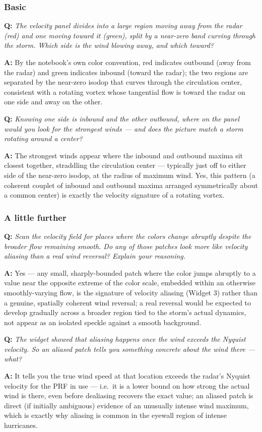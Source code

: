 \documentclass[11pt]{article}
\newenvironment{qa}[1]{\par\noindent\textbf{\color{qgray}Q: }\emph{#1}\par\noindent\textbf{A: }}{\par\vspace{6pt}}
\newcommand{\tier}[1]{\subsubsection*{#1}}
\begin{document}
\tier{Basic}
\begin{qa}{The velocity panel divides into a large region moving away from the radar (red) and one moving toward it (green), split by a near-zero band curving through the storm. Which side is the wind blowing away, and which toward?}
By the notebook's own color convention, red indicates outbound (away from the radar) and green indicates inbound (toward the radar); the two regions are separated by the near-zero isodop that curves through the circulation center, consistent with a rotating vortex whose tangential flow is toward the radar on one side and away on the other.
\end{qa}
\begin{qa}{Knowing one side is inbound and the other outbound, where on the panel would you look for the strongest winds --- and does the picture match a storm rotating around a center?}
The strongest winds appear where the inbound and outbound maxima sit closest together, straddling the circulation center --- typically just off to either side of the near-zero isodop, at the radius of maximum wind. Yes, this pattern (a coherent couplet of inbound and outbound maxima arranged symmetrically about a common center) is exactly the velocity signature of a rotating vortex.
\end{qa}

\tier{A little further}
\begin{qa}{Scan the velocity field for places where the colors change abruptly despite the broader flow remaining smooth. Do any of those patches look more like velocity aliasing than a real wind reversal? Explain your reasoning.}
Yes --- any small, sharply-bounded patch where the color jumps abruptly to a value near the opposite extreme of the color scale, embedded within an otherwise smoothly-varying flow, is the signature of velocity aliasing (Widget 3) rather than a genuine, spatially coherent wind reversal; a real reversal would be expected to develop gradually across a broader region tied to the storm's actual dynamics, not appear as an isolated speckle against a smooth background.
\end{qa}
\begin{qa}{The widget showed that aliasing happens once the wind exceeds the Nyquist velocity. So an aliased patch tells you something concrete about the wind there --- what?}
It tells you the true wind speed at that location exceeds the radar's Nyquist velocity for the PRF in use --- i.e.\ it is a lower bound on how strong the actual wind is there, even before dealiasing recovers the exact value; an aliased patch is direct (if initially ambiguous) evidence of an unusually intense wind maximum, which is exactly why aliasing is common in the eyewall region of intense hurricanes.
\end{qa}
\end{document}
